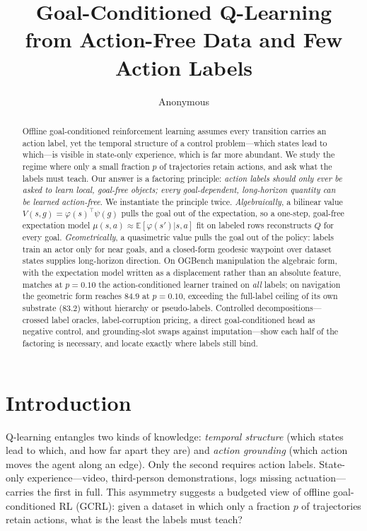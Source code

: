 \documentclass{article}
\title{Goal-Conditioned Q-Learning\\from Action-Free Data and Few Action Labels}
\author{Anonymous}
\newcommand{\E}{\mathbb{E}}
\theoremstyle{plain}
\theoremstyle{definition}
\begin{document}
\maketitle

\begin{abstract}
Offline goal-conditioned reinforcement learning assumes every transition carries an action label, yet the temporal structure of a control problem---which states lead to which---is visible in state-only experience, which is far more abundant. We study the regime where only a small fraction $p$ of trajectories retain actions, and ask what the labels must teach. Our answer is a factoring principle: \emph{action labels should only ever be asked to learn local, goal-free objects; every goal-dependent, long-horizon quantity can be learned action-free}. We instantiate the principle twice. \emph{Algebraically}, a bilinear value $V(s,g)=\varphi(s)^{\!\top}\psi(g)$ pulls the goal out of the expectation, so a one-step, goal-free expectation model $\mu(s,a)\!\approx\!\E[\varphi(s')|s,a]$ fit on labeled rows reconstructs $Q$ for every goal. \emph{Geometrically}, a quasimetric value pulls the goal out of the policy: labels train an actor only for near goals, and a closed-form geodesic waypoint over dataset states supplies long-horizon direction. On OGBench manipulation the algebraic form, with the expectation model written as a displacement rather than an absolute feature, matches at $p{=}0.10$ the action-conditioned learner trained on \emph{all} labels; on navigation the geometric form reaches $84.9$ at $p{=}0.10$, exceeding the full-label ceiling of its own substrate ($83.2$) without hierarchy or pseudo-labels. Controlled decompositions---crossed label oracles, label-corruption pricing, a direct goal-conditioned head as negative control, and grounding-slot swaps against imputation---show each half of the factoring is necessary, and locate exactly where labels still bind.
\end{abstract}

\section{Introduction}
Q-learning entangles two kinds of knowledge: \emph{temporal structure} (which states lead to which, and how far apart they are) and \emph{action grounding} (which action moves the agent along an edge). Only the second requires action labels. State-only experience---video, third-person demonstrations, logs missing actuation---carries the first in full. This asymmetry suggests a budgeted view of offline goal-conditioned RL (GCRL): given a dataset in which only a fraction $p$ of trajectories retain actions, what is the least the labels must teach?
\end{document}
